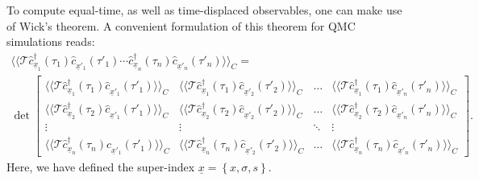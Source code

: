 To compute equal-time, as well as time-displaced observables, one can make use of Wick's theorem. A convenient formulation of this theorem for QMC simulations reads: 
\begin{multline}
\label{Wick.eq}
\langle \langle 	\mathcal{T}   \hat{c}^{\dagger}_{\underline x_{1}}(\tau_{1}) \hat{c}^{\phantom\dagger}_{{\underline x}'_{1}}(\tau'_{1})  
\cdots \hat{c}^{\dagger}_{\underline x_{n}}(\tau_{n}) \hat{c}^{\phantom\dagger}_{{\underline x}'_{n}}(\tau'_{n}) 
\rangle \rangle_{C} = \\
\det  
\begin{bmatrix}
   \langle \langle   \mathcal{T}   \hat{c}^{\dagger}_{\underline x_{1}}(\tau_{1}) \hat{c}^{\phantom\dagger}_{{\underline x}'_{1}}(\tau'_{1})  \rangle \rangle_{C} & 
    \langle \langle  \mathcal{T}   \hat{c}^{\dagger}_{\underline x_{1}}(\tau_{1}) \hat{c}^{\phantom\dagger}_{{\underline x}'_{2}}(\tau'_{2})  \rangle \rangle_{C}  & \dots   &   
    \langle \langle   \mathcal{T}   \hat{c}^{\dagger}_{\underline x_{1}}(\tau_{1}) \hat{c}^{\phantom\dagger}_{{\underline x}'_{n}}(\tau'_{n})  \rangle \rangle_{C}  \\
    \langle \langle   \mathcal{T}   \hat{c}^{\dagger}_{\underline x_{2}}(\tau_{2}) \hat{c}^{\phantom\dagger}_{{\underline x}'_{1}}(\tau'_{1})  \rangle \rangle_{C}  & 
      \langle \langle   \mathcal{T}   \hat{c}^{\dagger}_{\underline x_{2}}(\tau_{2}) \hat{c}^{\phantom\dagger}_{{\underline x}'_{2}}(\tau'_{2})  \rangle \rangle_{C}  & \dots  &
       \langle \langle   \mathcal{T}   \hat{c}^{\dagger}_{\underline x_{2}}(\tau_{2}) \hat{c}^{\phantom\dagger}_{{\underline x}'_{n}}(\tau'_{n})  \rangle \rangle_{C}   \\
    \vdots & \vdots &  \ddots & \vdots \\
    \langle \langle   \mathcal{T}   \hat{c}^{\dagger}_{\underline x_{n}}(\tau_{n}) \hat{c}^{\phantom\dagger}_{{\underline x}'_{1}}(\tau'_{1})  \rangle \rangle_{C}   & 
     \langle \langle   \mathcal{T}   \hat{c}^{\dagger}_{\underline x_{n}}(\tau_{n}) \hat{c}^{\phantom\dagger}_{{\underline x}'_{2}}(\tau'_{2})  \rangle \rangle_{C}   & \dots  & 
     \langle \langle   \mathcal{T}   \hat{c}^{\dagger}_{\underline x_{n}}(\tau_{n}) \hat{c}^{\phantom\dagger}_{{\underline x}'_{n}}(\tau'_{n})  \rangle \rangle_{C}
 \end{bmatrix}.
\end{multline}
Here, we have defined the super-index $\underline{ x} = \left\{   x,\sigma,s \right\}$.

